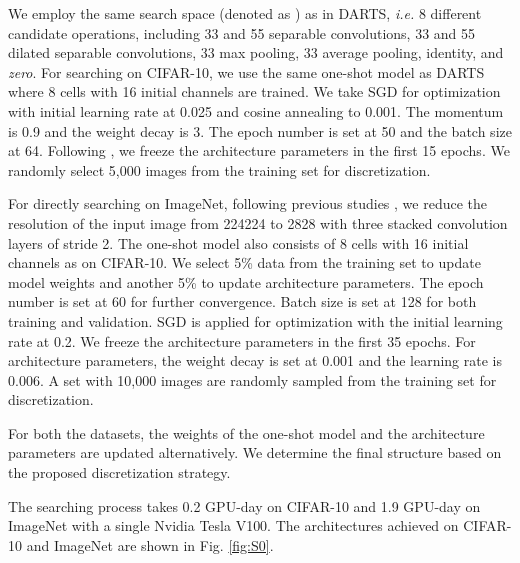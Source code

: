 \documentclass[journal]{IEEEtran}
\begin{document}
We employ the same search space (denoted as ) as in DARTS, \emph{i.e.} 8 different candidate operations, including 33 and 55 separable convolutions, 33 and 55 dilated separable convolutions, 33 max pooling, 33 average pooling, identity, and \emph{zero}. For searching on CIFAR-10, we use the same one-shot model as DARTS where 8 cells with 16 initial channels are trained. We take SGD for optimization with initial learning rate at 0.025 and cosine annealing to 0.001. The momentum is 0.9 and the weight decay is 3. The epoch number is set at 50 and the batch size at 64. Following \cite{DBLP:journals/corr/abs-1907-05737}, we freeze the architecture parameters in the first 15 epochs. We randomly select 5,000 images from the training set for discretization. 

For directly searching on ImageNet, following previous studies \cite{DBLP:journals/corr/abs-1909-06035, DBLP:journals/corr/abs-1907-05737}, we reduce the resolution of the input image from 224224 to 2828 with three stacked convolution layers of stride 2. The one-shot model also consists of 8 cells with 16 initial channels as on CIFAR-10. We select 5\% data from the training set to update model weights and another 5\% to update architecture parameters. The epoch number is set at 60 for further convergence. Batch size is set at 128 for both training and validation. SGD is applied for optimization with the initial learning rate at 0.2. We freeze the architecture parameters in the first 35 epochs. For architecture parameters, the weight decay is set at 0.001 and the learning rate is 0.006. A set with 10,000 images are randomly sampled from the training set for discretization.

For both the datasets, the weights of the one-shot model and the architecture parameters are updated alternatively. We determine the final structure based on the proposed discretization strategy. 

The searching process takes 0.2 GPU-day on CIFAR-10 and 1.9 GPU-day on ImageNet with a single Nvidia Tesla V100. The architectures achieved on CIFAR-10 and ImageNet are shown in Fig. \ref{fig:S0}. 
\end{document}
